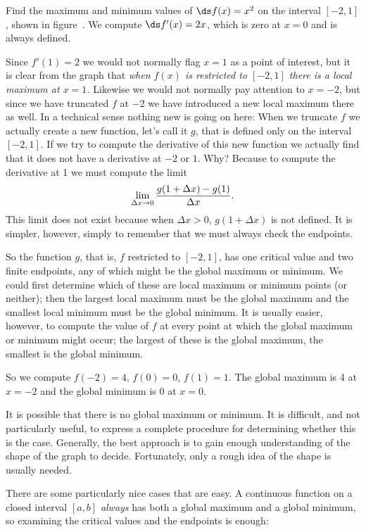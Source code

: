 \begin{example} Find the maximum and minimum values of $\ds f(x)=x^2$ on the
interval $[-2,1]$, shown in figure~.  We
compute $\ds f'(x)=2x$, which is zero at $x=0$ and is always
defined. 

Since $f'(1)=2$ we would not normally flag $x=1$ as a point
of interest, but it is clear from the graph that {\it when $f(x)$ is
restricted to $[-2,1]$ there is a local maximum at $x=1$.} Likewise we
would not normally pay attention to $x=-2$, but since we have
truncated $f$ at $-2$ we have introduced a new local maximum there as
well. In a technical sense nothing new is going on here: When we
truncate $f$ we actually create a new function, let's call it $g$,
that is defined only on the interval $[-2,1]$. If we try to compute
the derivative of this new function we actually find that it does not
have a derivative at $-2$ or $1$. Why? Because to compute the
derivative at 1 we must compute the limit
$$\lim_{\Delta x\to 0} {g(1+\Delta x)-g(1)\over \Delta x}.$$
This limit does not exist because when $\Delta x>0$, 
$g(1+\Delta x)$ is not defined. It is simpler, however, simply to
remember that we must always check the endpoints.

So the function $g$, that is, $f$ restricted to $[-2,1]$, has one
critical value and two finite endpoints, any of which might be the
global maximum or minimum. We could first determine which of these are
local maximum or minimum points (or neither); then the largest local
maximum must be the global maximum and the smallest local minimum must
be the global minimum. It is usually easier, however, to compute the
value of $f$ at every point at which the global maximum or minimum
might occur; the largest of these is the global maximum, the smallest
is the global minimum.

So we compute $f(-2)=4$, $f(0)=0$, $f(1)=1$. The global maximum is 4
at $x=-2$ and the global minimum is 0 at $x=0$.
\end{example}

It is possible that there is no global maximum or minimum. It is
difficult, and not particularly useful, to express a complete procedure for
determining whether this is the case. Generally, the best approach is
to gain enough understanding of the shape of the graph to
decide. Fortunately, only a rough idea of the shape is usually needed.

There are some particularly nice cases that are easy. A
continuous function on a closed interval $[a,b]$ {\it
  always\/} has both a global maximum and a global minimum, so examining
the critical values and the endpoints is enough:

